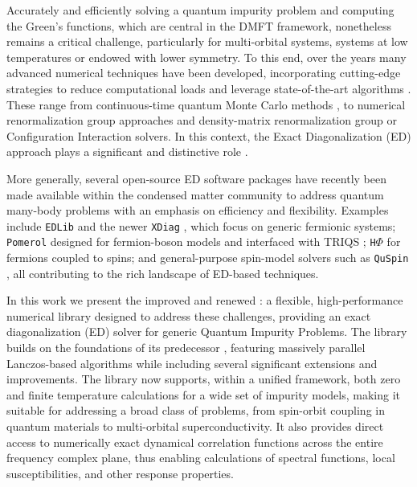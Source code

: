 \documentclass[edipack_sp.tex]{subfiles}
\begin{document}
Accurately and efficiently solving a quantum impurity problem and computing the Green's functions, which are central in the DMFT framework, nonetheless remains a critical challenge, particularly for multi-orbital systems, systems
at low temperatures or endowed with lower symmetry.
%
To this end, over the years 
many advanced numerical techniques have been developed, incorporating cutting-edge strategies to reduce computational loads and leverage state-of-the-art algorithms \cite{Bauer2011JOSMTAE,Parcollet2015CPC}. 
These range from continuous-time quantum Monte Carlo 
methods \cite{Gull2011RMP,Rubtsov2005PRB,Haule2007PRB,Seth2016CPC,Wallerberger2019CPC},
to numerical renormalization group approaches \cite{Zitko2009PRB,Bulla2001PRB,Bulla2008RMP,Debertolis2021PRB} 
and density-matrix renormalization group \cite{Zitko2009PRB,Bulla2001PRB,Bulla2008RMP,Nunez-Fernandez2025A} or Configuration Interaction \cite{Zgid2012PRB,Lu2014PRB,Go2017PRB,Bi2019CPC,Mejuto-Zaera2019PRB} solvers. 
In this context, the Exact Diagonalization (ED) approach plays a significant 
and distinctive role \cite{Caffarel1994PRL,Dolfen2006,Perroni2007PRB,Capone2007PRB,Weber2012PRB,Lu2017TEPJST,Amaricci2022CPC}.

More generally, several open-source ED software packages have recently been made available  within the condensed matter community to address quantum many-body problems with an emphasis on efficiency and flexibility. Examples include \texttt{EDLib} \cite{Iskakov2017} and the newer 
\texttt{XDiag} \cite{Wietek2025}, which focus on generic fermionic systems; 
\texttt{Pomerol} \cite{Antipov2015} designed for fermion-boson models and interfaced with TRIQS \cite{Parcollet2015CPC}; \texttt{H$\Phi$} \cite{Kawamura2017CPC,Ido2024CPC} 
for fermions coupled to spins; and general-purpose spin-model solvers such as 
\texttt{QuSpin} \cite{Weinberg2017SP,Weinberg2019SP}, all contributing to the 
rich landscape of ED-based techniques.


In this work we present the improved and renewed \NAME{}: a flexible, high-performance numerical library designed to address these challenges, providing an exact diagonalization (ED) solver for generic Quantum Impurity Problems. 
The library builds on the foundations of
its predecessor \cite{Amaricci2022CPC}, featuring massively parallel Lanczos-based algorithms \cite{Lanczos1950JRNBSB,Lehoucq1998,Maschhoff1996} while including several significant extensions and improvements. The library now supports, within a unified framework, both zero and finite temperature calculations \cite{Amaricci2022CPC,Capone2007PRB} for a wide set of impurity models, making it suitable for addressing a broad class of problems, from spin-orbit coupling in quantum materials to multi-orbital superconductivity. It also provides direct
access to numerically exact dynamical correlation functions across the
entire frequency complex plane, thus enabling calculations of spectral functions, local susceptibilities, and other response properties.
\end{document}
